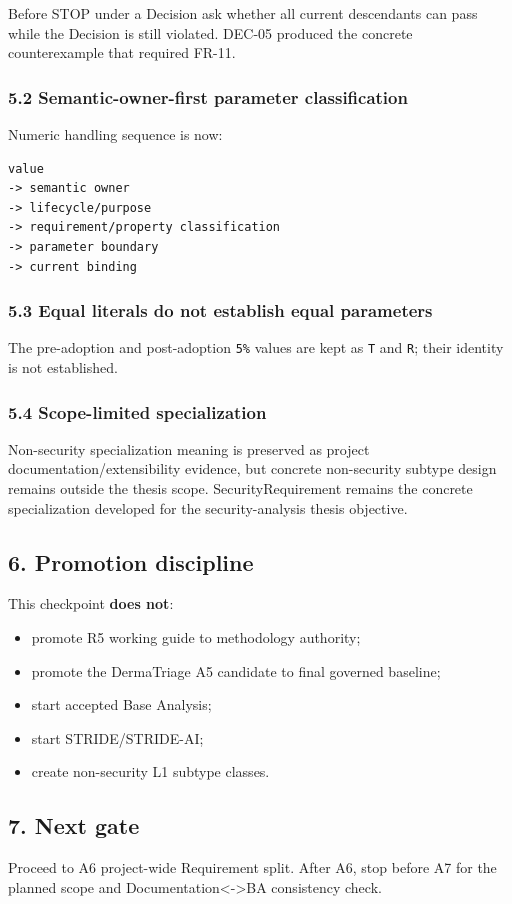 \documentclass[11pt,a4paper]{article}
\providecommand{\tightlist}{\setlength{\itemsep}{0pt}\setlength{\parskip}{0pt}}
\begin{document}
Before STOP under a Decision ask whether all current descendants can
pass while the Decision is still violated. DEC-05 produced the concrete
counterexample that required FR-11.

\subsubsection{5.2 Semantic-owner-first parameter
classification}\label{52-semantic-owner-first-parameter-classification}

Numeric handling sequence is now:

\begin{verbatim}
value
-> semantic owner
-> lifecycle/purpose
-> requirement/property classification
-> parameter boundary
-> current binding
\end{verbatim}

\subsubsection{5.3 Equal literals do not establish equal
parameters}\label{53-equal-literals-do-not-establish-equal-parameters}

The pre-adoption and post-adoption \texttt{5\%} values are kept as
\texttt{T} and \texttt{R}; their identity is not established.

\subsubsection{5.4 Scope-limited
specialization}\label{54-scope-limited-specialization}

Non-security specialization meaning is preserved as project
documentation/extensibility evidence, but concrete non-security subtype
design remains outside the thesis scope. SecurityRequirement remains the
concrete specialization developed for the security-analysis thesis
objective.

\subsection{6. Promotion discipline}\label{6-promotion-discipline}

This checkpoint \textbf{does not}:

\begin{itemize}
\tightlist
\item
  promote R5 working guide to methodology authority;
\item
  promote the DermaTriage A5 candidate to final governed baseline;
\item
  start accepted Base Analysis;
\item
  start STRIDE/STRIDE-AI;
\item
  create non-security L1 subtype classes.
\end{itemize}

\subsection{7. Next gate}\label{7-next-gate}

Proceed to A6 project-wide Requirement split. After A6, stop before A7
for the planned scope and Documentation\textless-\textgreater BA
consistency check.
\end{document}
